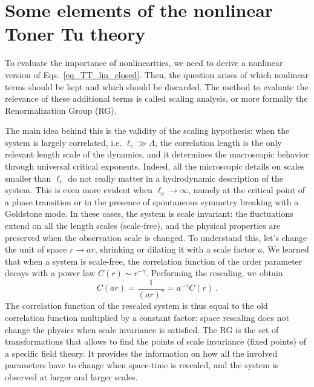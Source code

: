 \section{Some elements of the nonlinear Toner Tu theory}

To evaluate the importance of nonlinearities, we need to derive a nonlinear version of Eqs.~\eqref{eq_TT_lin_closed}.
Then, the question arises of which nonlinear terms should be kept and which should be discarded. The method to evaluate the relevance of these additional terms is called scaling analysis, or more formally the Renormalization Group (RG). 

The main idea behind this is the validity of the scaling hypothesis: when the system is largely correlated, i.e. $\ell_c \gg \Lambda$, the correlation length is the only relevant length scale of the dynamics, and it determines the macroscopic behavior through universal critical exponents. Indeed, all the microscopic details on scales smaller than $\ell_c$ do not really matter in a hydrodynamic description of the system. This is even more evident when $\ell_c \to \infty$, namely at the critical point of a phase transition or in the presence of spontaneous symmetry breaking with a Goldstone mode. In these cases, the system is scale invariant: the fluctuations extend on all the length scales (scale-free), and the physical properties are preserved when the observation scale is changed. To understand this, let's change the unit of space $r \to a r$, shrinking or dilating it with a scale factor $a$. We learned that when a system is scale-free, the correlation function of the order parameter decays with a power law $C(r) \sim r^{-\gamma}$. Performing the rescaling, we obtain
$$
C(ar) = \frac{1}{(ar)^{\gamma}} = a^{-\gamma} C(r) \ .
$$
The correlation function of the rescaled system is thus equal to the old correlation function multiplied by a constant factor: space rescaling does not change the physics when scale invariance is satisfied.  The RG is the set of transformations that allows to find the points of scale invariance (fixed points) of a specific field theory. It provides the information on how all the involved parameters have to change when space-time is rescaled, and the system is observed at larger and larger scales. 


